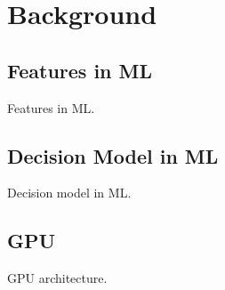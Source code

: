 \section{Background}

\subsection{Features in ML}


Features in ML.

\subsection{Decision Model in ML}




Decision model in ML.

\subsection{GPU}

GPU architecture.